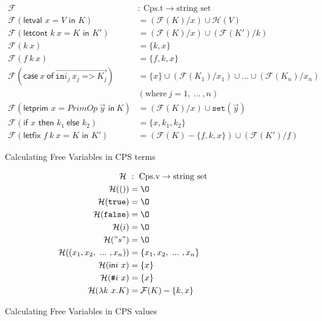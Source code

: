 \documentclass{article}
\theoremstyle{definition}
\theoremstyle{remark}
\numberwithin{equation}{section}
\begin{document}
\begin{figure}[!ht]
  \centering
\begin{align*}
\mathcal{F}\ &:\ \textrm{Cps.t} \to \textrm{string set}\\     %
\mathcal{F}(\textsf{letval }x=V\textsf{ in }K)
    &=(\mathcal{F}(K)/x)\cup \mathcal{H}(V)\\   %
\mathcal{F}(\textsf{letcont }k\ x=K\textsf{ in }K')
    &=(\mathcal{F}(K)/x)\cup (\mathcal{F}(K')/k)\\   %
\mathcal{F}(k\ x)
    &=\{k, x\}\\   %
\mathcal{F}(f\ k\ x)
    &=\{f, k, x\}\\   %
\mathcal{F}(\textsf{case}\ x\ \textsf{of}
            \ \overrightarrow{\texttt{in}i_j\ x_j\ \texttt{=>}\ K_j})
    &=\{x\}\cup (\mathcal{F}(K_1)/x_1)\cup ... \cup (\mathcal{F}(K_n)/x_n)\\
        & (\textrm{where}\ j = 1,\ ...\ , n)\\   %
\mathcal{F}(\textsf{letprim }x=PrimOp\ \vec{y}\textsf{ in}\ K)
    &=(\mathcal{F}(K)/x)\cup \texttt{set}(\vec{y})\\   %
\mathcal{F}(\textsf{if }x\textsf{ then }k_1\ \textsf{else }k_2)
    &=\{x, k_1, k_2\}\\   %
\mathcal{F}(\textsf{letfix }f\ k\ x=K\textsf{ in }K')
    &=(\mathcal{F}(K)-\{f,k,x\})\cup (\mathcal{F}(K')/f)   %
\end{align*}
  \caption{Calculating Free Variables in CPS terms}
  \label{fig-sub}
\end{figure}

\begin{figure}[!ht]
  \centering
\begin{align*}
\mathcal{H}\ &:\ \textrm{Cps.v} \to \textrm{string set}\\     %
\mathcal{H}(()) &={\O}\\   %
\mathcal{H}(\texttt{true}) &={\O}\\   %
\mathcal{H}(\texttt{false}) &={\O}\\   %
\mathcal{H}(i) &={\O}\\   %
\mathcal{H}("s") &={\O}\\   %
\mathcal{H}((x_1, x_2,\ ...\ , x_n)) &=\{x_1, x_2,\ ...\ , x_n\}\\   %
\mathcal{H}(\textsf{in}i\ x) &= \{x\}\\        %
\mathcal{H}(\texttt{\#}i\ x) &= \{x\}\\        %
\mathcal{H}(\lambda k\ x.K) &= \mathcal{F}(K)-\{k, x\}      %
\end{align*}
  \caption{Calculating Free Variables in CPS values}
  \label{fig-sub}
\end{figure}
\end{document}
